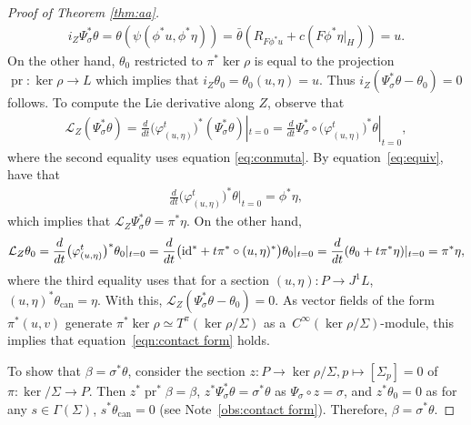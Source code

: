 \documentclass[10pt,a4paper]{amsart}
\numberwithin{equation}{section}
\newcommand{\pr}{\operatorname{pr}}
\begin{document}
\begin{proof}[Proof of Theorem \ref{thm:aa}]
\begin{gather*}
 i_Z\Psi^*_\sigma\theta=\theta(\psi(\phi^*u,\phi^*\eta))=\bar\theta(R_{F\phi^*u}+c(F\phi^*\eta|_H))=u.
\end{gather*}
On the other hand, $\theta_0$ restricted to $\pi^*\ker\rho$ is equal to the projection $\pr\colon \ker\rho\to L$ which implies that $i_Z\theta_0=\theta_{0}(u,\eta)=u$. Thus $i_Z(\Psi_\sigma^*\theta-\theta_0)=0$ follows. To compute the Lie derivative along $Z$, observe that
\begin{gather*}
 \mathcal{L}_Z(\Psi^*_\sigma\theta )= \frac{d}{dt}\big(\varphi^t_{(u,\eta)}\big)^*(\Psi^*_\sigma\theta)|_{t=0} =\frac{d}{dt}\Psi^*_\sigma\circ
\big(\varphi^t_{(u,\eta)}\big)^*\theta|_{t=0},
\end{gather*}
where the second equality uses equation \eqref{eq:conmuta}. By equation~\eqref{eq:equiv}, have that
\begin{gather*}
 \frac{d}{dt}\big(\varphi^t_{(u,\eta)}\big)^*\theta|_{t=0}=\phi^*\eta,
\end{gather*}
which implies that $\mathcal{L}_Z\Psi^*_\sigma\theta=\pi^*\eta$. On the other hand,
\begin{gather*} \mathcal{L}_Z\theta_0=\frac{d}{dt}\big(\varphi^t_{(u,\eta)}\big)^*\theta_0|_{t=0}=\frac{d}{dt}\big({\rm id}^*+t\pi^*\circ(u,\eta)^*\big)\theta_0|_{t=0}=\frac{d}{dt}(\theta_0+t\pi^*\eta)|_{t=0}=\pi^*\eta,
\end{gather*}
where the third equality uses that for a section $(u,\eta)\colon P\to J^1L$, $(u,\eta)^*\theta_{\mathrm{can}}=\eta$. With this, $\mathcal{L}_Z(\Psi_\sigma^*\theta-\theta_0)=0$. As vector f\/ields of the form $\pi^*(u,v)$ generate $\pi^*\ker\rho\simeq T^\pi(\ker\rho/\Sigma)$ as a~$C^\infty(\ker\rho/\Sigma)$-module, this implies that equation~\eqref{eqn:contact form} holds.

To show that $\beta=\sigma^*\theta$, consider the section $z\colon P\to \ker\rho/\Sigma, p\mapsto [\Sigma_p]=0$ of $\pi\colon \ker/\Sigma\to P$. Then $z^*\operatorname{pr}^*\beta=\beta$, $z^*\Psi_\sigma^*\theta=\sigma^*\theta$ as $\Psi_\sigma\circ z=\sigma$, and $z^*\theta_0=0$ as for any $s\in\Gamma(\Sigma)$, $s^*\theta_{\mathrm{can}}=0$ (see Note~\ref{obs:contact form}). Therefore, $\beta=\sigma^*\theta$.


\end{proof}
\end{document}

